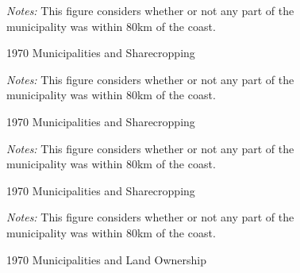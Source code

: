 \documentclass{article}
\begin{document}
\begin{figure}
  \caption{1970 Municipalities and Sharecropping}
  \begin{center}
  \textit{Notes:} This figure considers whether or not any part of the municipality was within 80km of the coast.
  \end{center}
  \label{fig:sugarcane_grid}
\end{figure}

\clearpage

\begin{figure}[h!]
  \caption{1970 Municipalities and Sharecropping}
  \begin{center}
  \textit{Notes:} This figure considers whether or not any part of the municipality was within 80km of the coast.
  \end{center}
  \label{fig:sharecropping_1970}
\end{figure}

\begin{figure}[h!]
  \caption{1970 Municipalities and Sharecropping}
  \begin{center}
  \textit{Notes:} This figure considers whether or not any part of the municipality was within 80km of the coast.
  \end{center}
  \label{fig:sharecropping_1970}
\end{figure}

\begin{figure}
  \caption{1970 Municipalities and Land Ownership}
  \begin{center}
  \textit{Notes:} This figure considers whether or not any part of the municipality was within 80km of the coast.
  \end{center}
  \label{fig:land_ownership_1970}
\end{figure}
\end{document}
